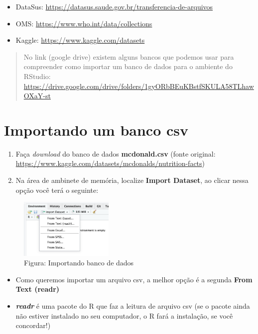 \documentclass[
]{book}
\begin{document}
\begin{itemize}
\item
  DataSus: \url{https://datasus.saude.gov.br/transferencia-de-arquivos}
\item
  OMS: \url{https://www.who.int/data/collections}
\item
  Kaggle: \url{https://www.kaggle.com/datasets}
\end{itemize}

\begin{quote}
No link (google drive) existem alguns bancos que podemos usar para compreender como importar um banco de dados para o ambiente do RStudio: \url{https://drive.google.com/drive/folders/1gyORbBEuKBstfSKULA58TLhawOXaY-st}
\end{quote}

\section{Importando um banco csv}\label{importando-um-banco-csv}

\begin{enumerate}
\def\labelenumi{\arabic{enumi}.}
\item
  Faça \emph{download} do banco de dados \textbf{mcdonald.csv}
  (fonte original: \url{https://www.kaggle.com/datasets/mcdonalds/nutrition-facts})
\item
  Na área de ambinete de memória, localize \textbf{Import Dataset}, ao clicar nessa opção você terá o seguinte:
\end{enumerate}

\begin{figure}
\centering
\includegraphics[width=0.4\textwidth,height=\textheight]{telaImportDataset.png}
\caption{ Figura: Importando banco de dados}
\end{figure}

\begin{itemize}
\item
  Como queremos importar um arquivo csv, a melhor opção é a segunda \textbf{From Text (readr)}
\item
  \textbf{\emph{readr}} é uma pacote do R que faz a leitura de arquivo csv (se o pacote ainda não estiver instalado no seu computador, o R fará a instalação, se você concordar!)
\end{itemize}
\end{document}
